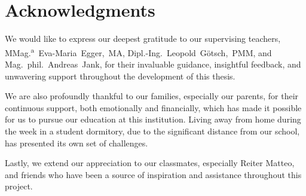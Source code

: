 \chapter*{Acknowledgments}

We would like to express our deepest gratitude to our supervising teachers, \mbox{MMag.\textsuperscript{a} Eva-Maria Egger, MA}, \mbox{Dipl.-Ing.\ Leopold Götsch, PMM}, and \mbox{Mag.\ phil.\ Andreas Jank}, for their invaluable guidance, insightful feedback, and unwavering support throughout the development of this thesis.

We are also profoundly thankful to our families, especially our parents, for their continuous support, both emotionally and financially, which has made it possible for us to pursue our education at this institution. Living away from home during the week in a  student dormitory, due to the significant distance from our school, has presented its own set of challenges.

Lastly, we extend our appreciation to our classmates, especially Reiter Matteo, and friends who have been a source of inspiration and assistance throughout this project.

